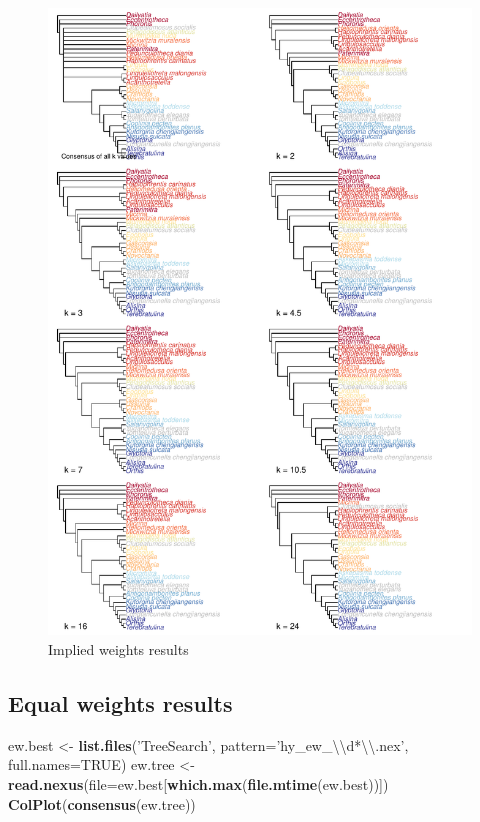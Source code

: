 \documentclass[]{book}
\newenvironment{Shaded}{\begin{snugshade}}{\end{snugshade}}
\newcommand{\KeywordTok}[1]{\textcolor[rgb]{0.13,0.29,0.53}{\textbf{#1}}}
\newcommand{\DataTypeTok}[1]{\textcolor[rgb]{0.13,0.29,0.53}{#1}}
\newcommand{\CharTok}[1]{\textcolor[rgb]{0.31,0.60,0.02}{#1}}
\newcommand{\StringTok}[1]{\textcolor[rgb]{0.31,0.60,0.02}{#1}}
\newcommand{\OtherTok}[1]{\textcolor[rgb]{0.56,0.35,0.01}{#1}}
\newcommand{\NormalTok}[1]{#1}
\theoremstyle{definition}
\theoremstyle{definition}
\theoremstyle{definition}
\theoremstyle{remark}
\begin{document}
\begin{figure}
\centering
\includegraphics{Brachiopod_phylogeny_files/figure-latex/unnamed-chunk-2-1.pdf}
\caption{\label{fig:unnamed-chunk-2}Implied weights results}
\end{figure}

\hypertarget{equal-weights-results}{%
\subsection{Equal weights results}\label{equal-weights-results}}

\begin{Shaded}
\begin{Highlighting}[]
\NormalTok{ew.best <-}\StringTok{ }\KeywordTok{list.files}\NormalTok{(}\StringTok{'TreeSearch'}\NormalTok{, }\DataTypeTok{pattern=}\StringTok{'hy_ew_}\CharTok{\textbackslash{}\textbackslash{}}\StringTok{d*}\CharTok{\textbackslash{}\textbackslash{}}\StringTok{.nex'}\NormalTok{, }\DataTypeTok{full.names=}\OtherTok{TRUE}\NormalTok{)}
\NormalTok{ew.tree <-}\StringTok{ }\KeywordTok{read.nexus}\NormalTok{(}\DataTypeTok{file=}\NormalTok{ew.best[}\KeywordTok{which.max}\NormalTok{(}\KeywordTok{file.mtime}\NormalTok{(ew.best))])}
\KeywordTok{ColPlot}\NormalTok{(}\KeywordTok{consensus}\NormalTok{(ew.tree))}
\end{Highlighting}
\end{Shaded}
\end{document}
